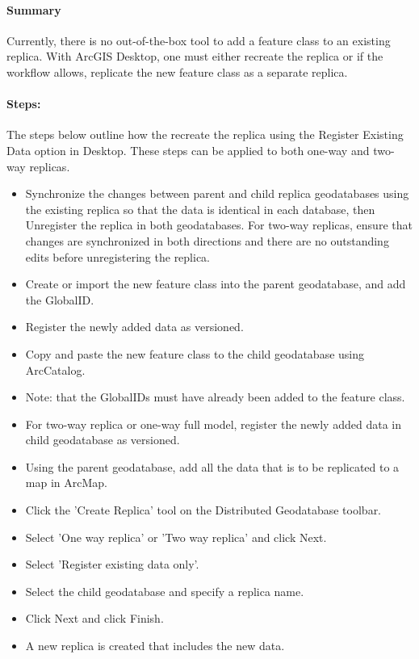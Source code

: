 \documentclass[class=article , crop=false, titlepage, twoside, multi={itemize, figure, verbatim}, float=false]{standalone}
\begin{document}
\begin{multicols}{2}
\paragraph[Summary]{Summary \texorpdfstring{\\}{}}
Currently, there is no out-of-the-box tool to add a feature class to an existing replica. With ArcGIS Desktop, one must either recreate the replica or if the workflow allows, replicate the new feature class as a separate replica.
\paragraph[Steps]{Steps:\texorpdfstring{\\}{}}
The steps below outline how the recreate the replica using the Register Existing Data option in Desktop. These steps can be applied to both one-way and two-way replicas.
\begin{itemize}
\item Synchronize the changes between parent and child replica geodatabases using the existing replica so that the data is identical in each database, then Unregister the replica in both geodatabases. For two-way replicas, ensure that changes are synchronized in both directions and there are no outstanding edits before unregistering the replica.
\item Create or import the new feature class into the parent geodatabase, and add the GlobalID.
\item Register the newly added data as versioned.
\item Copy and paste the new feature class to the child geodatabase using ArcCatalog.
\item Note: that the GlobalIDs must have already been added to the feature class.
\item For two-way replica or one-way full model, register the newly added data in child geodatabase as versioned.
\item Using the parent geodatabase, add all the data that is to be replicated to a map in ArcMap.
\item Click the 'Create Replica' tool on the Distributed Geodatabase toolbar.
\item Select 'One way replica' or 'Two way replica' and click Next.
\item Select 'Register existing data only'.
\item Select the child geodatabase and specify a replica name.
\item Click Next and click Finish.
\item A new replica is created that includes the new data.
\end{itemize}
\end{multicols}
\end{document}
